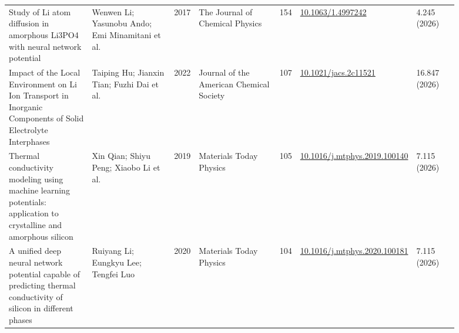 \documentclass[10pt,a4paper]{article}
\begin{document}
{\begin{longtable}{p{0.200\linewidth}p{0.200\linewidth}p{0.043\linewidth}p{0.200\linewidth}p{0.043\linewidth}p{0.106\linewidth}p{0.100\linewidth}}
Study of Li atom diffusion in amorphous Li3PO4 with neural network potential & Wenwen Li; Yasunobu Ando; Emi Minamitani et al. & 2017 & The Journal of Chemical Physics & 154 & \href{https://doi.org/10.1063/1.4997242}{10.1063/1.4997242} & 4.245 (2026) \\
Impact of the Local Environment on Li Ion Transport in Inorganic Components of Solid Electrolyte Interphases & Taiping Hu; Jianxin Tian; Fuzhi Dai et al. & 2022 & Journal of the American Chemical Society & 107 & \href{https://doi.org/10.1021/jacs.2c11521}{10.1021/jacs.2c11521} & 16.847 (2026) \\
Thermal conductivity modeling using machine learning potentials: application to crystalline and amorphous silicon & Xin Qian; Shiyu Peng; Xiaobo Li et al. & 2019 & Materials Today Physics & 105 & \href{https://doi.org/10.1016/j.mtphys.2019.100140}{10.1016/j.mtphys.2019.100140} & 7.115 (2026) \\
A unified deep neural network potential capable of predicting thermal conductivity of silicon in different phases & Ruiyang Li; Eungkyu Lee; Tengfei Luo & 2020 & Materials Today Physics & 104 & \href{https://doi.org/10.1016/j.mtphys.2020.100181}{10.1016/j.mtphys.2020.100181} & 7.115 (2026) \\
\hline
\end{longtable}}
\end{document}
